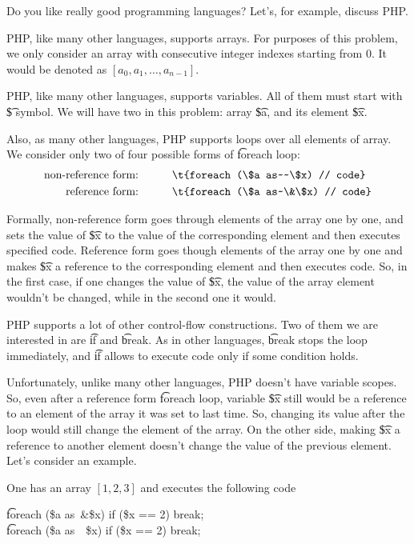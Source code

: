 Do you like really good programming languages?  Let's, for example, discuss PHP.

PHP, like many other languages, supports arrays. For purposes of this problem, we only consider an array with consecutive integer indexes starting from 0. It would be denoted as $[a_0, a_1, \dots, a_{n-1}]$.

PHP, like many other languages, supports variables. All of them must start with \t{\$} symbol. We will have two in this problem: array \t{\$a}, and its element \t{\$x}.

Also, as many other languages, PHP supports loops over all elements of array. We consider only two of four possible forms of \t{foreach} loop:
\begin{align*}
\text{non-reference form:\hspace{3em}} & \t{foreach (\$a as~~\$x) // code} \\
\text{reference form:\hspace{3em}} & \t{foreach (\$a as~\&\$x) // code}
\end{align*}

Formally, non-reference form goes through elements of the array one by one, and sets the value of \t{\$x} to the value of the corresponding element and then executes specified code. Reference form goes though elements of the array one by one and makes \t{\$x} a reference to the corresponding element and then executes code. So, in the first case, if one changes the value of \t{\$x}, the value of the array element wouldn't be changed, while in the second one it would.

PHP supports a lot of other control-flow constructions. Two of them we are interested in are \t{if} and \t{break}. As in other languages, \t{break} stops the loop immediately, and \t{if} allows to execute code only if some condition holds.

Unfortunately, unlike many other languages, PHP doesn't have variable scopes. So, even after a reference form \t{foreach} loop, variable \t{\$x} still would be a reference to an element of the array it was set to last time. So, changing its value after the loop would still change the element of the array. On the other side, making \t{\$x} a reference to another element doesn't change the value of the previous element. Let's consider an example.

One has an array $[1, 2, 3]$ and executes the following code 

\begin{center}
\t{foreach (\$a as~\&\$x) if (\$x == 2) break;} \\
\t{foreach (\$a as~~\$x) if (\$x == 2) break;} \\
\end{center}

